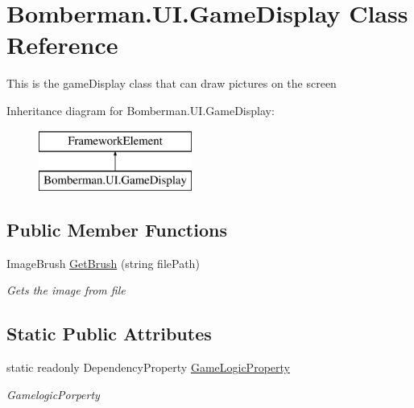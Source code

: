 \hypertarget{class_bomberman_1_1_u_i_1_1_game_display}{}\section{Bomberman.\+U\+I.\+Game\+Display Class Reference}
\label{class_bomberman_1_1_u_i_1_1_game_display}


This is the game\+Display class that can draw pictures on the screen  


Inheritance diagram for Bomberman.\+U\+I.\+Game\+Display\+:\begin{figure}[H]
\begin{center}
\leavevmode
\includegraphics[height=2.000000cm]{class_bomberman_1_1_u_i_1_1_game_display}
\end{center}
\end{figure}
\subsection*{Public Member Functions}
\begin{DoxyCompactItemize}
\item 
Image\+Brush \mbox{\hyperlink{class_bomberman_1_1_u_i_1_1_game_display_a913d517f4a4e170c1efb6798c8822454}{Get\+Brush}} (string file\+Path)
\begin{DoxyCompactList}\small\item\em Gets the image from file \end{DoxyCompactList}\end{DoxyCompactItemize}
\subsection*{Static Public Attributes}
\begin{DoxyCompactItemize}
\item 
static readonly Dependency\+Property \mbox{\hyperlink{class_bomberman_1_1_u_i_1_1_game_display_a2f077cba4dd5b952c75a3a75b98269f8}{Game\+Logic\+Property}}
\begin{DoxyCompactList}\small\item\em Gamelogic\+Porperty \end{DoxyCompactList}\end{DoxyCompactItemize}
